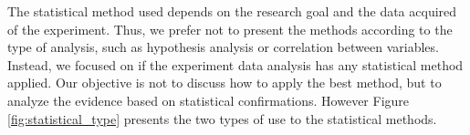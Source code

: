 	\begin{figure}[h] 

   	    \captionsetup{width=16cm}%
	\end{figure}

The statistical method used depends on the research goal and the data acquired of the experiment. Thus, we prefer not to present the methods according to the type of analysis, such as hypothesis analysis or correlation between variables. Instead, we focused on if the experiment data analysis has any statistical method applied. Our objective is not to discuss how to apply the best method, but to analyze the evidence based on statistical confirmations. However Figure \ref{fig:statistical_type} presents the two types of use to the statistical methods.

	\begin{figure}[h] 

   	    \captionsetup{width=12cm}%
	\end{figure}

